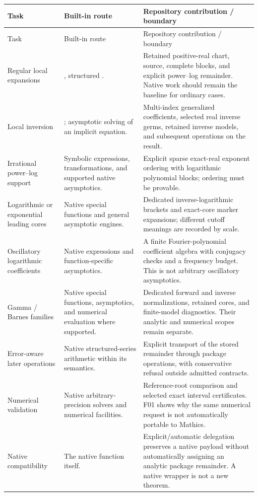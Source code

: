 \documentclass[11pt,letterpaper]{article}
\newcommand{\code}[1]{\texttt{\detokenize{#1}}}
\begin{document}
\begin{longtable}{@{}P{1.30in}P{2.36in}P{2.62in}@{}}
\toprule
Task & Built-in route & Repository contribution / boundary\\
\midrule\endfirsthead
\toprule Task & Built-in route & Repository contribution / boundary\\\midrule\endhead
Regular local expansions & \code{Series}, structured \code{SeriesData}. & Retained positive-real chart, source, complete blocks, and explicit power--log remainder. Native work should remain the baseline for ordinary cases.\\[5pt]
Local inversion & \code{InverseSeries}; asymptotic solving of an implicit equation. & Multi-index generalized coefficients, selected real inverse germs, retained inverse models, and subsequent operations on the result.\\[5pt]
Irrational power--log support & Symbolic expressions, transformations, and supported native asymptotics. & Explicit sparse exact-real exponent ordering with logarithmic polynomial blocks; ordering must be provable.\\[5pt]
Logarithmic or exponential leading cores & Native special functions and general asymptotic engines. & Dedicated inverse-logarithmic brackets and exact-core marker expansions; different cutoff meanings are recorded by scale.\\[5pt]
Oscillatory logarithmic coefficients & Native expressions and function-specific asymptotics. & A finite Fourier-polynomial coefficient algebra with conjugacy checks and a frequency budget. This is not arbitrary oscillatory asymptotics.\\[5pt]
Gamma / Barnes families & Native special functions, asymptotics, and numerical evaluation where supported. & Dedicated forward and inverse normalizations, retained cores, and finite-model diagnostics. Their analytic and numerical scopes remain separate.\\[5pt]
Error-aware later operations & Native structured-series arithmetic within its semantics. & Explicit transport of the stored remainder through package operations, with conservative refusal outside admitted contracts.\\[5pt]
Numerical validation & Native arbitrary-precision solvers and numerical facilities. & Reference-root comparison and selected exact interval certificates. F01 shows why the same numerical request is not automatically portable to Mathics.\\[5pt]
Native compatibility & The native function itself. & Explicit/automatic delegation preserves a native payload without automatically assigning an analytic package remainder. A native wrapper is not a new theorem.\\
\bottomrule
\end{longtable}
\end{document}
